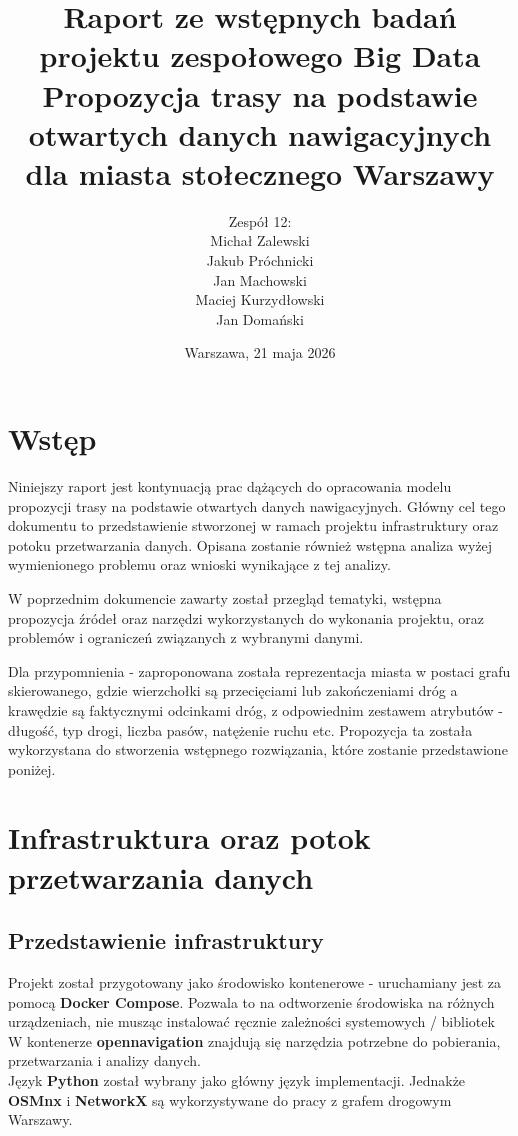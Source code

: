 \documentclass[12pt]{article}
\title{\textbf{Raport ze wstępnych badań projektu zespołowego Big Data
\newline
\newline
Propozycja trasy na podstawie otwartych danych nawigacyjnych dla miasta stołecznego Warszawy}}
\author{Zespół 12: \\ Michał Zalewski \\ Jakub Próchnicki \\ Jan Machowski \\ Maciej Kurzydłowski \\ Jan Domański}
\date{Warszawa, 21 maja 2026}
\begin{document}
\maketitle
\newpage
\tableofcontents
\newpage




\section{Wstęp}

Niniejszy raport jest kontynuacją prac dążących do opracowania modelu propozycji trasy na podstawie otwartych danych 
nawigacyjnych. Główny cel tego dokumentu to przedstawienie stworzonej w ramach projektu infrastruktury oraz potoku 
przetwarzania danych. Opisana zostanie również wstępna analiza wyżej wymienionego problemu oraz wnioski 
wynikające z tej analizy.

W poprzednim dokumencie zawarty został przegląd tematyki, wstępna propozycja źródeł oraz narzędzi 
wykorzystanych do wykonania projektu, oraz problemów i ograniczeń związanych z wybranymi danymi.

Dla przypomnienia - zaproponowana została reprezentacja miasta w postaci grafu skierowanego, 
gdzie wierzchołki są przecięciami lub zakończeniami dróg a krawędzie
są faktycznymi odcinkami dróg, z odpowiednim zestawem atrybutów - długość, typ drogi, liczba pasów, natężenie ruchu
etc. Propozycja ta została wykorzystana do stworzenia wstępnego rozwiązania, które zostanie przedstawione poniżej.



\section{Infrastruktura oraz potok przetwarzania danych}

\subsection{Przedstawienie infrastruktury}
Projekt został przygotowany jako środowisko kontenerowe - uruchamiany jest za pomocą \textbf{Docker Compose}. Pozwala to na odtworzenie środowiska na różnych urządzeniach, nie musząc instalować ręcznie zależności systemowych / bibliotek W kontenerze \textbf{opennavigation} znajdują się narzędzia potrzebne do pobierania, przetwarzania i analizy danych.\\

\noindent Język \textbf{Python} został wybrany jako główny język implementacji. Jednakże \textbf{OSMnx} i \textbf{NetworkX} są wykorzystywane do pracy z grafem drogowym Warszawy.\\
\end{document}
